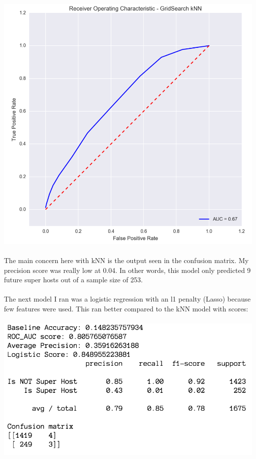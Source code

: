 \documentclass[10pt,letterpapter]{article}
\begin{document}
\begin{paragraph}
\includegraphics[scale=0.50]{knnroc.png}
\\ \\
The main concern here with kNN is the output seen in the confusion matrix. My precision score was really low at 0.04. In other words, this model only predicted 9 future super hosts out of a sample size of 253.
\\ \\
\indent \indent
The next model I ran was a logistic regression with an l1 penalty (Lasso) because few features were used. This ran better compared to the kNN model with scores:
\\ \\
\includegraphics[scale=0.65]{logisticscores.png} \\

\end{paragraph}
\end{document}

